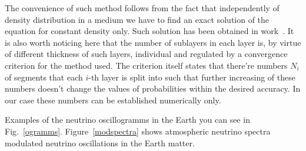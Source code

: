 The convenience of such method follows from the fact that independently of density distribution in a medium we have to find an exact solution of the equation for constant density only. Such solution has been obtained in work~\cite{Naumov:1991ju,Naumov:1991rh}. It is also worth noticing here that the number of sublayers in each layer is, by virtue of different thickness of such layers, individual and regulated by a convergence criterion for the method used. The criterion itself states that there're numbers ${N_{i}}$ of segments that each $i$-th layer is split into such that further increasing of these numbers doesn't change the values of probabilities within the desired accuracy. In our case these numbers can be established numerically only.

Examples of the neutrino oscillogramms in the Earth you can see in Fig.~\ref{ogramms}. Figure~\ref{modspectra} shows atmospheric neutrino spectra modulated neutrino oscillations in the Earth matter.

